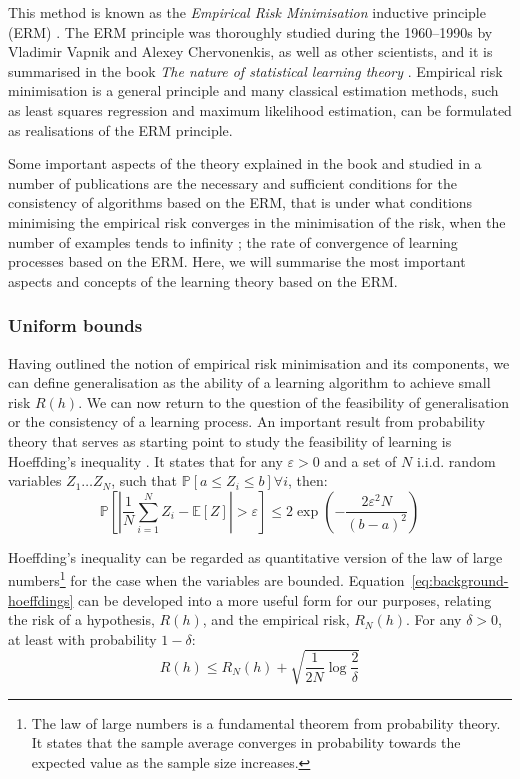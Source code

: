{This method is known as the \textit{Empirical Risk Minimisation} inductive principle (ERM) \cite{vapnik1982erm, vapnik1992erm}. The ERM principle was thoroughly studied during the 1960--1990s by Vladimir Vapnik and Alexey Chervonenkis, as well as other scientists, and it is summarised in the book \textit{The nature of statistical learning theory} \cite{vapnik1995learningtheory}. Empirical risk minimisation is a general principle and many classical estimation methods, such as least squares regression and maximum likelihood estimation, can be formulated as realisations of the ERM principle.

Some important aspects of the theory explained in the book and studied in a number of publications are the necessary and sufficient conditions for the consistency of algorithms based on the ERM, that is under what conditions minimising the empirical risk converges in the minimisation of the risk, when the number of examples tends to infinity \cite{vapnik1991necessary}; the rate of convergence of learning processes based on the ERM. Here, we will summarise the most important aspects and concepts of the learning theory based on the ERM.

\subsubsection{Uniform bounds}
Having outlined the notion of empirical risk minimisation and its components, we can define generalisation as the ability of a learning algorithm to achieve small risk $R(h)$. We can now return to the question of the feasibility of generalisation or the consistency of a learning process. An important result from probability theory that serves as starting point to study the feasibility of learning is Hoeffding's inequality \cite{hoeffding1963hoeffding}. It states that for any $\varepsilon > 0$ and a set of $N$ i.i.d. random variables $Z_{1} \ldots Z_{N}$, such that $\mathbb{P} \left[a \leq Z_{i} \leq b \right] \forall i$, then:
%
\begin{equation}
\label{eq:background-hoeffdings}
    \mathbb{P} \left[ \left| \frac{1}{N} \sum_{i=1}^{N}Z_{i} - \mathbb{E}\left[Z\right] \right| > \varepsilon \right] \leq 2 \exp \left( -\frac{2\varepsilon^{2}N}{(b-a)^{2}} \right)
\end{equation}

Hoeffding's inequality can be regarded as quantitative version of the law of large numbers\footnote{The law of large numbers is a fundamental theorem from probability theory. It states that the sample average converges in probability towards the expected value as the sample size increases.} for the case when the variables are bounded. Equation~\ref{eq:background-hoeffdings} can be developed into a more useful form for our purposes, relating the risk of a hypothesis, $R(h)$, and the empirical risk, $R_{N}(h)$. For any $\delta > 0$, at least with probability $1 - \delta$:
%
\begin{equation}
\label{eq:background-hoeffdings_risk_single}
    R(h) \leq R_{N}(h) + \sqrt{\frac{1}{2N}\log\frac{2}{\delta}}
\end{equation}

}
